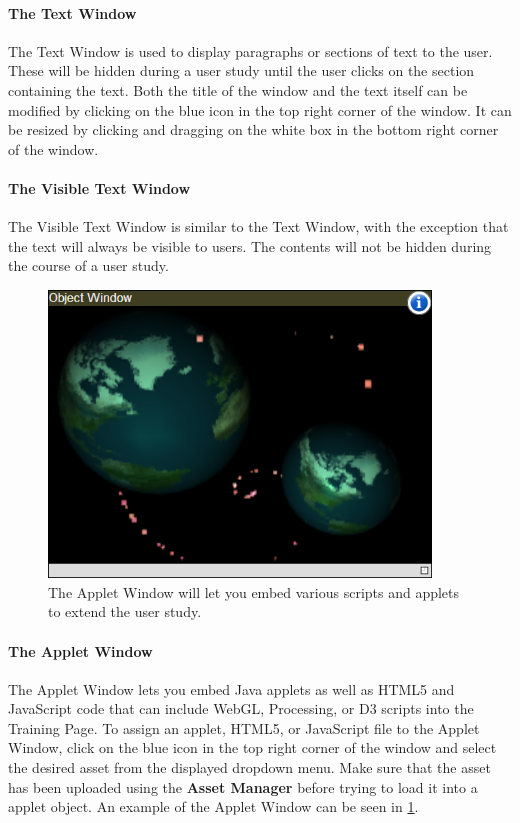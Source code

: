 \documentclass[article]{ij4uq}              %
\begin{document}
\paragraph{The Text Window}
The Text Window is used to display paragraphs or sections of text to the user. These will be hidden during a user study until the user clicks on the section containing the text. Both the title of the window and the text itself can be modified by clicking on the blue icon in the top right corner of the window. It can be resized by clicking and dragging on the white box in the bottom right corner of the window.

\paragraph{The Visible Text Window}
The Visible Text Window is similar to the Text Window, with the exception that the text will always be visible to users.  The contents will not be hidden during the course of a user study.

\begin{figure}[h!]
 \centering
 \includegraphics[width=4.0in]{figures/webgl.png}
 \caption{The Applet Window will let you embed various scripts and applets to extend the user study.}
 \label{fig:webgl}
\end{figure}
\FloatBarrier

\paragraph{The Applet Window}
The Applet Window lets you embed Java applets as well as HTML5 and JavaScript code that can include WebGL, Processing, or D3 scripts into the Training Page.  To assign an applet, HTML5, or JavaScript file to the Applet Window, click on the blue icon in the top right corner of the window and select the desired asset from the displayed dropdown menu.  Make sure that the asset has been uploaded using the \textbf{Asset Manager} before trying to load it into a applet object.  An example of the Applet Window can be seen in \ref{fig:webgl}.
\end{document}
